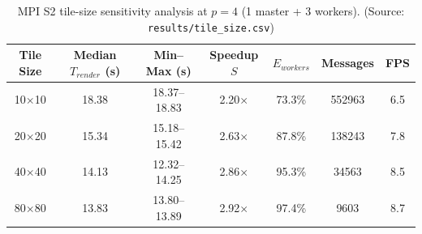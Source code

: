 \begin{table}[htbp]
\centering
\small
\caption{MPI S2 tile-size sensitivity analysis at $p=4$ (1 master + 3 workers). (Source: \texttt{results/tile\_size.csv})}
\label{tab:tile_size}
\begin{tabular}{ccccccc}
\toprule
\textbf{Tile Size} & \textbf{Median} $T_{render}$ (s) & \textbf{Min--Max} (s) & \textbf{Speedup} $S$ & $E_{workers}$ & \textbf{Messages} & \textbf{FPS} \\
\midrule
10$\times$10 & 18.38 & 18.37--18.83 & 2.20$\times$ & 73.3\% & 552963 & 6.5 \\
20$\times$20 & 15.34 & 15.18--15.42 & 2.63$\times$ & 87.8\% & 138243 & 7.8 \\
40$\times$40 & 14.13 & 12.32--14.25 & 2.86$\times$ & 95.3\% & 34563 & 8.5 \\
80$\times$80 & 13.83 & 13.80--13.89 & 2.92$\times$ & 97.4\% & 9603 & 8.7 \\
\bottomrule
\end{tabular}
\end{table}
